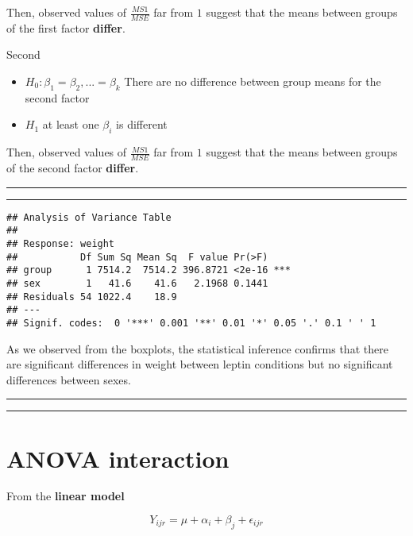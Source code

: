 \documentclass[
]{book}
\begin{document}
Then, observed values of \(\frac{MS1}{MSE}\) far from \(1\) suggest that the means between groups of the first factor \textbf{differ}.

Second

\begin{itemize}
\item
  \(H_0: \beta_1=\beta_2, ...=\beta_k\) There are no difference between group means for the second factor
\item
  \(H_1\) at least one \(\beta_i\) is different
\end{itemize}

Then, observed values of \(\frac{MS1}{MSE}\) far from \(1\) suggest that the means between groups of the second factor \textbf{differ}.

\begin{center}\rule{0.5\linewidth}{0.5pt}\end{center}

\begin{center}\rule{0.5\linewidth}{0.5pt}\end{center}

\begin{verbatim}
## Analysis of Variance Table
## 
## Response: weight
##           Df Sum Sq Mean Sq  F value Pr(>F)    
## group      1 7514.2  7514.2 396.8721 <2e-16 ***
## sex        1   41.6    41.6   2.1968 0.1441    
## Residuals 54 1022.4    18.9                    
## ---
## Signif. codes:  0 '***' 0.001 '**' 0.01 '*' 0.05 '.' 0.1 ' ' 1
\end{verbatim}

As we observed from the boxplots, the statistical inference confirms that there are significant differences in weight between leptin conditions but no significant differences between sexes.

\begin{center}\rule{0.5\linewidth}{0.5pt}\end{center}

\begin{center}\rule{0.5\linewidth}{0.5pt}\end{center}

\hypertarget{anova-interaction}{%
\section{ANOVA interaction}\label{anova-interaction}}

From the \textbf{linear model}

\[Y_{ijr} = \mu + \alpha_i + \beta_j + \epsilon_{ijr}\]
\end{document}
